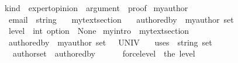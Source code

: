 \begin{isabellebody}
\begin{isamarkuptext}
\begin{figure}
\begin{isarbox}
\begin{isabelle}
\ kind\ {\isacharequal}{\kern0pt}\ expert{\isacharunderscore}{\kern0pt}opinion\ {\isacharbar}{\kern0pt}\ argument\ {\isacharbar}{\kern0pt}\ {\isachardoublequoteopen}proof{\isachardoublequoteclose}\isanewline
\isanewline
{}\ myauthor\ {\isacharequal}{\kern0pt}\isanewline
\ \ email\ {\isacharcolon}{\kern0pt}{\isacharcolon}{\kern0pt}\ {\isachardoublequoteopen}string{\isachardoublequoteclose}\ {\isacharless}{\kern0pt}{\isacharequal}{\kern0pt}\ {\isachardoublequoteopen}{\isacharprime}{\kern0pt}{\isacharprime}{\kern0pt}{\isacharprime}{\kern0pt}{\isacharprime}{\kern0pt}{\isachardoublequoteclose}\isanewline
{}\ mytext{\isacharunderscore}{\kern0pt}section\ {\isacharequal}{\kern0pt}\isanewline
\ \ authored{\isacharunderscore}{\kern0pt}by\ {\isacharcolon}{\kern0pt}{\isacharcolon}{\kern0pt}\ {\isachardoublequoteopen}myauthor\ set{\isachardoublequoteclose}\ {\isacharless}{\kern0pt}{\isacharequal}{\kern0pt}\ {\isachardoublequoteopen}{\isacharbraceleft}{\kern0pt}{\isacharbraceright}{\kern0pt}{\isachardoublequoteclose}\isanewline
\ \ level\ {\isacharcolon}{\kern0pt}{\isacharcolon}{\kern0pt}\ {\isachardoublequoteopen}int\ option{\isachardoublequoteclose}\ {\isacharless}{\kern0pt}{\isacharequal}{\kern0pt}\ {\isachardoublequoteopen}None{\isachardoublequoteclose}\isanewline
{}\ myintro\ {\isacharequal}{\kern0pt}\ mytext{\isacharunderscore}{\kern0pt}section\ {\isacharplus}{\kern0pt}\isanewline
\ \ authored{\isacharunderscore}{\kern0pt}by\ {\isacharcolon}{\kern0pt}{\isacharcolon}{\kern0pt}\ {\isachardoublequoteopen}myauthor\ set{\isachardoublequoteclose}\ \ {\isacharless}{\kern0pt}{\isacharequal}{\kern0pt}\ {\isachardoublequoteopen}UNIV{\isachardoublequoteclose}\ \isanewline
\ \ uses\ {\isacharcolon}{\kern0pt}{\isacharcolon}{\kern0pt}\ {\isachardoublequoteopen}string\ set{\isachardoublequoteclose}\isanewline
\ \ \ author{\isacharunderscore}{\kern0pt}set\ {\isacharcolon}{\kern0pt}{\isacharcolon}{\kern0pt}\ {\isachardoublequoteopen}authored{\isacharunderscore}{\kern0pt}by\ {\isasymsigma}\ {\isasymnoteq}\ {\isacharbraceleft}{\kern0pt}{\isacharbraceright}{\kern0pt}{\isachardoublequoteclose}\isanewline
\ \ \ force{\isacharunderscore}{\kern0pt}level\ {\isacharcolon}{\kern0pt}{\isacharcolon}{\kern0pt}\ {\isachardoublequoteopen}the\ {\isacharparenleft}{\kern0pt}level\ {\isasymsigma}{\isacharparenright}{\kern0pt}\ {\isachargreater}{\kern0pt}\ {}{\isachardoublequoteclose}\isanewline

\end{isabelle}
\end{isarbox}
\end{figure}
\end{isamarkuptext}
\end{isabellebody}
